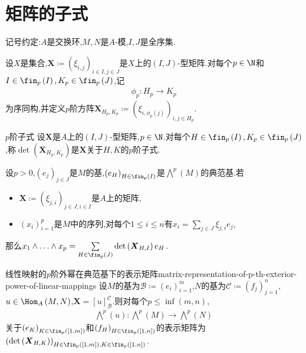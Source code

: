 \section{矩阵的子式}

记号约定:$A$是交换环,$M,N$是$A$-模,$I,J$是全序集.

\begin{definition}{}{}
	设$X$是集合,$\boldsymbol{X}\coloneq\left(\xi_{i,j}\right)_{i\in I,j\in J}$是$X$上的$\left(I,J\right)$-型矩阵.对每个$p\in\N$和$I\in\fin_{p}\left(I\right),K_{p}\in\fin_{p}\left(J\right)$,记
	\begin{align*}
		\phi_{p}:H_{p}\to K_{p}
	\end{align*}
	为序同构,并定义$p$阶方阵$\boldsymbol{X}_{H_{p},K_{p}}\coloneq\left(\xi_{i,\phi_{p}\left(j\right)}\right)_{i,j\in H_{p}}$.
\end{definition}

\begin{definition}{$p$阶子式}{}
	设$\boldsymbol{X}$是$A$上的$\left(I,J\right)$-型矩阵,$p\in\N$.对每个$H\in\fin_{p}\left(I\right),K_{p}\in\fin_{p}\left(J\right)$,称$\det\left(\boldsymbol{X}_{H_{p},K_{p}}\right)$是$\boldsymbol{X}$关于$H,K$的$p$阶子式.
\end{definition}

\begin{proposition}{}{}
	设$p>0$,$\left(e_{j}\right)_{j\in J}$是$M$的基,$\left(e_{H}\right)_{H\in\fin_{p}\left(I\right)}$是$\bigwedge\limits^{p}\left(M\right)$的典范基.若
	\begin{itemize}
		\item $\boldsymbol{X}\coloneq\left(\xi_{j,i}\right)_{j\in J,i\in I}$是$A$上的矩阵,
		\item $\left(x_{i}\right)_{i=1}^{p}$是$M$中的序列,对每个$1\leq i\leq n$有$x_{i}=\sum\limits_{j\in J}\xi_{j,i}e_{j}$,
	\end{itemize}
	那么$x_{1}\wedge\ldots\wedge x_{p}=\sum\limits_{H\in\fin_{p}\left(J\right)}\det\left(\boldsymbol{X}_{H,I}\right)e_{H}$.
\end{proposition}

\begin{proposition}{线性映射的$p$阶外幂在典范基下的表示矩阵}{matrix-representation-of-p-th-exterior-power-of-linear-mappings}
	设$M$的基为$\mathcal{B}\coloneq\left(e_{i}\right)_{i=1}^{m}$,$N$的基为$\mathcal{C}\coloneq\left(f_{j}\right)_{j=1}^{n}$,$u\in\Hom_{A}\left(M,N\right)$,$\boldsymbol{X}=\left[u\right]_{\mathcal{B}}^{\mathcal{C}}$.则对每个$p\leq\inf\left(m,n\right)$,
	\begin{align*}
		\bigwedge\limits^{p}\left(u\right):\bigwedge\limits^{p}\left(M\right)\to\bigwedge\limits^{p}\left(N\right)
	\end{align*}
	关于$\left(e_{K}\right)_{K\in\fin_{p}\left(\left[1,m\right]\right)}$和$\left(f_{H}\right)_{H\in\fin_{p}\left(\left[1,n\right]\right)}$的表示矩阵为$\left(\det\left(\boldsymbol{X}_{H,K}\right)\right)_{H\in\fin_{p}\left(\left[1,m\right]\right),K\in\fin_{p}\left(\left[1,n\right]\right)}$.
\end{proposition}

